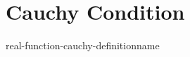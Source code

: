 \documentclass[preview]{standalone}
\begin{document}
\genpage

\section{Cauchy Condition}

\begin{snippetdefinition}{real-function-cauchy-definition}{name}
    \todo
\end{snippetdefinition}
\end{document}
